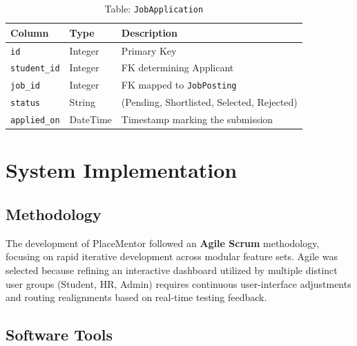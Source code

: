 \documentclass[a4paper,12pt]{report}
\begin{document}
\begin{table}[H]
\centering
\caption{Table: \texttt{JobApplication}}
\vspace{6pt}
\renewcommand{\arraystretch}{1.3}
\begin{tabular}{|l|l|p{7cm}|}
\hline
\textbf{Column} & \textbf{Type} & \textbf{Description} \\
\hline
\texttt{id}             & Integer & Primary Key \\
\texttt{student\_id}    & Integer & FK determining Applicant \\
\texttt{job\_id}        & Integer & FK mapped to \texttt{JobPosting} \\
\texttt{status}         & String  & (Pending, Shortlisted, Selected, Rejected) \\
\texttt{applied\_on}    & DateTime& Timestamp marking the submission \\
\hline
\end{tabular}
\label{tab:db_applications}
\end{table}


\chapter{System Implementation}

\section{Methodology}

The development of PlaceMentor followed an \textbf{Agile Scrum} methodology, focusing on rapid iterative development across modular feature sets. Agile was selected because refining an interactive dashboard utilized by multiple distinct user groups (Student, HR, Admin) requires continuous user-interface adjustments and routing realignments based on real-time testing feedback.

\section{Software Tools}
\end{document}
